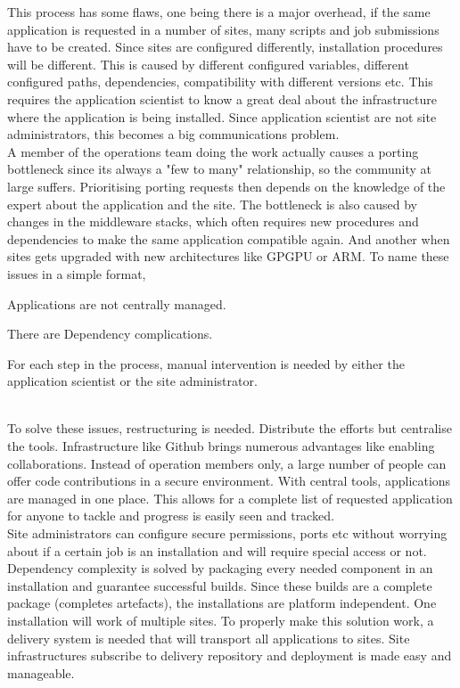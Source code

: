 \documentclass [titlepage,11pt]{article}
\begin{document}
This process has some flaws, one being there is a major overhead, if the same application is requested in a number of sites, many scripts and job submissions have to be created. Since sites are configured differently, installation procedures will be different. This is caused by different configured variables, different configured paths, dependencies, compatibility with different versions etc. This requires the application scientist to know a great deal about the infrastructure where the application is being installed. Since application scientist are not site administrators, this becomes a big communications problem. \\

A member of the operations team doing the work actually causes a porting bottleneck since its always a "few to many" relationship, so the community at large suffers. Prioritising porting requests then depends on the knowledge of the expert about the application and the site. The bottleneck is also caused by changes in the middleware stacks, which often requires new procedures and dependencies to make the same application compatible again. And another when sites gets upgraded with new architectures like GPGPU or ARM. To name these issues in a simple format, \begin{enumerate*}[label=\itshape\alph*\upshape)]
\item Applications are not centrally managed.
\item There are Dependency complications.
\item For each step in the process, manual intervention is needed by either the application scientist or the site administrator.
\end{enumerate*} \\

To solve these issues, restructuring is needed. Distribute the efforts but centralise the tools. Infrastructure like Github brings numerous advantages like enabling collaborations. Instead of operation members only, a large number of people can offer code contributions in a secure environment. With central tools, applications are managed in one place. This allows for a complete list of requested application for anyone to tackle and progress is easily seen and tracked. \\ 

Site administrators can configure secure permissions, ports etc without worrying about if a certain job is an installation and will require special access or not. Dependency complexity is solved by packaging every needed component in an installation and guarantee successful builds. Since these builds are a complete package (completes artefacts), the installations are platform independent. One installation will work of multiple sites. To properly make this solution work, a delivery system is needed that will transport all applications to sites. Site infrastructures subscribe to delivery repository and  deployment is made easy and manageable. \\
\end{document}
